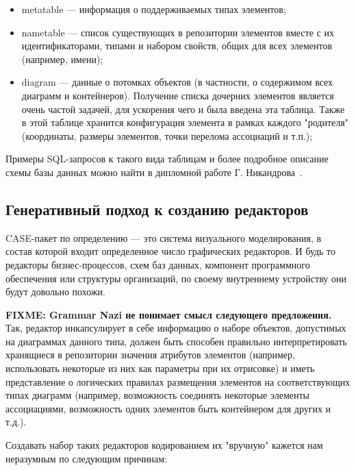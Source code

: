 \documentclass[a5paper]{article}
\begin{document}
\begin{itemize}
  \item metatable --- информация о поддерживаемых типах элементов;
  \item nametable --- список существующих в репозитории
        элементов вместе с их идентификаторами, типами и набором свойств, общих
        для всех элементов (например, имени);
  \item diagram --- данные о потомках объектов (в
        частности, о содержимом всех диаграмм и контейнеров). Получение списка
        дочерних элементов является очень частой задачей, для ускорения чего и
        была введена эта таблица. Также в этой таблице хранится конфигурация
        элемента в рамках каждого "родителя" (координаты, размеры элементов,
        точки перелома ассоциаций и т.п.);
\end{itemize}

Примеры SQL-запросов к такого вида таблицам
и более подробное описание схемы базы данных можно найти в дипломной
работе Г. Никандрова~\cite{nikandrov}.

\subsection{Генеративный подход к созданию редакторов}

CASE-пакет по определению --- это система
визуального моделирования, в состав которой входит определенное число
графических редакторов. И будь то редакторы бизнес-процессов, схем баз
данных, компонент программного обеспечения или структуры организаций,
по своему внутреннему устройству они будут довольно похожи.

\textbf{FIXME: Grammar Nazi не понимает смысл следующего предложения.}
Так, редактор инкапсулирует в себе информацию о наборе объектов, допустимых
на диаграммах данного типа, должен быть способен правильно
интерпретировать хранящиеся в репозитории значения атрибутов элементов
(например, использовать некоторые из них как параметры при их
отрисовке) и иметь представление о логических правилах размещения
элементов на соответствующих типах диаграмм (например, возможность
соединять некоторые элементы ассоциациями, возможность одних элементов
быть контейнером для других и т.д.).

Создавать набор таких редакторов кодированием их "вручную" кажется нам
неразумным по следующим причинам:
\end{document}
